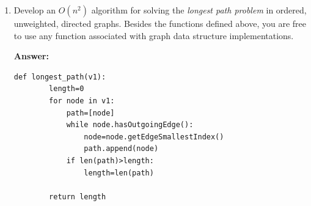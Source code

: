 \documentclass[12pt,letterpaper]{article}
\begin{document}
\begin{enumerate}
    \item Develop an $O(n^2)$ algorithm for solving the  \textit{longest path problem} in ordered, unweighted, directed graphs. 
    Besides the functions defined above, you are free to use any function associated with graph data structure implementations.
    \vspace{0.5cm}

    \textbf{Answer:}
    \begin{lstlisting}[style = Python]
    def longest_path(v1):
        length=0
        for node in v1:
            path=[node]
            while node.hasOutgoingEdge():
                node=node.getEdgeSmallestIndex()
                path.append(node)
            if len(path)>length:
                length=len(path)

        return length

    \end{lstlisting}
    
    
\end{enumerate}
\end{document}
